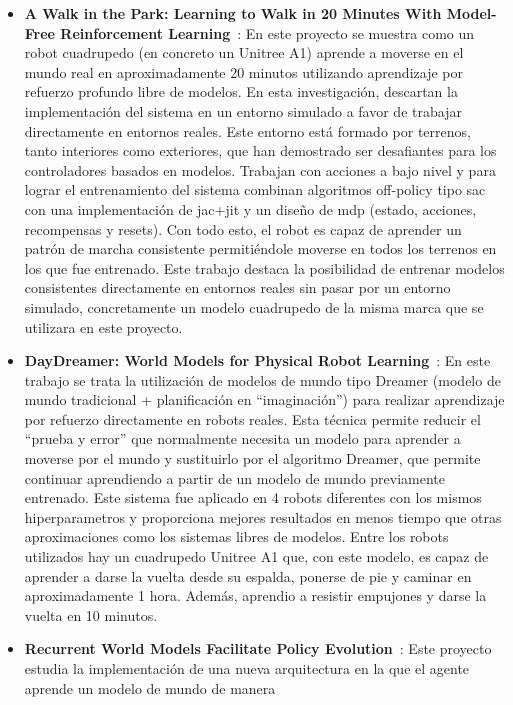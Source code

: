 \begin{itemize}
  \item \textbf{A Walk in the Park: Learning to Walk in 20 Minutes With Model-Free Reinforcement Learning}~\cite{smith2022walk}:
  En este proyecto se muestra como un robot cuadrupedo (en concreto un Unitree A1\cite{UnitreeA1dWeb}) aprende a moverse en el mundo real en 
  aproximadamente 20 minutos utilizando aprendizaje por refuerzo profundo libre de modelos. En esta investigación, descartan la 
  implementación del sistema en un entorno simulado a favor de trabajar directamente en entornos reales. Este entorno está 
  formado por terrenos, tanto interiores como exteriores, que han demostrado ser desafiantes para los controladores basados 
  en modelos. Trabajan con acciones a bajo nivel y para lograr el entrenamiento del sistema combinan algoritmos \gls{off-policy} tipo 
  \Gls{sac} con una implementación de \Gls{jac}+\Gls{jit} y un diseño de \Gls{mdp} (estado, acciones, recompensas y resets). Con 
  todo esto, el robot es capaz de aprender un patrón de marcha consistente permitiéndole moverse en todos los terrenos en los que 
  fue entrenado.
  Este trabajo destaca la posibilidad de entrenar modelos consistentes directamente en entornos reales sin pasar por un entorno 
  simulado, concretamente un modelo cuadrupedo de la misma marca que se utilizara en este proyecto.
  \item \textbf{DayDreamer: World Models for Physical Robot Learning}~\cite{wu2023daydreamer}: 
  En este trabajo se trata la utilización de modelos de mundo tipo Dreamer (modelo de mundo tradicional + planificación en “imaginación”) 
  para realizar aprendizaje por refuerzo directamente en robots reales. Esta técnica permite reducir el “prueba y error” que 
  normalmente necesita un modelo para aprender a moverse por el mundo y sustituirlo por el algoritmo Dreamer, que permite 
  continuar aprendiendo a partir de un modelo de mundo previamente entrenado. Este sistema fue aplicado en 4 robots diferentes 
  con los mismos hiperparametros y proporciona mejores resultados en menos tiempo que otras aproximaciones como los sistemas 
  libres de modelos. Entre los robots utilizados hay un cuadrupedo Unitree A1 que, con este modelo, es 
  capaz de aprender a darse la vuelta desde su espalda, ponerse de pie y caminar en aproximadamente 1 hora. Además, aprendio a 
  resistir empujones y darse la vuelta en 10 minutos.
  \item \textbf{Recurrent World Models Facilitate Policy Evolution}~\cite{ha2018recurrent}: 
  Este proyecto estudia la implementación de una nueva arquitectura en la que el agente aprende un modelo de mundo de manera 

\end{itemize}
